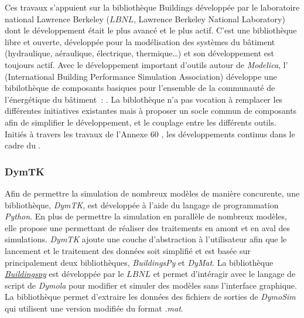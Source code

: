 Ces travaux s’appuient sur la bibliothèque Buildings \parencite{Wetter2014253} développée
par le laboratoire national Lawrence Berkeley ($LBNL$, Lawrence Berkeley National
Laboratory) dont le développement était le plus avancé et le plus actif. C’est une
bibliothèque libre et ouverte, développée pour la modélisation des systèmes du bâtiment
(hydraulique, aéraulique, électrique, thermique\dots) et son développement est toujours
actif.
Avec le développement important d’outils autour de \textit{Modelica}, l’
(International Building Performance Simulation Association) développe une bibilothèque de
composants basiques pour l’ensemble de la communauté de l’énergétique du bâtiment~:
. La biblothèque
n’a pas vocation à remplacer les différentes initiatives existantes mais à proposer un
socle commun de composants afin de simplifier le développement, et le couplage entre les
différents outils. Initiés à travers les travaux de l’Annexe $60$ \parencite{Wetter2015},
les développements continus dans le cadre du .


\subsubsection{DymTK} %
\label{ssub:dymtk}
Afin de permettre la simulation de nombreux modèles de manière concurente, une
bibliothèque, \textit{DymTK}, est développée à l’aide du langage de programmation
\textit{Python}. En plus de permettre la simulation en parallèle de nombreux modèles, elle
propose une  permettant de réaliser des traitements en amont et en aval des
simulations. \textit{DymTK} ajoute une couche d’abstraction à l’utilisateur afin que le
lancement et le traitement des données soit simplifié et est basée sur principalement deux
bibliothèques, \textit{BuildingsPy} et \textit{DyMat}. La bibliothèque
\href{http://simulationresearch.lbl.gov/modelica/buildingspy/}{\textit{Buildingspy}} est
développée par le $LBNL$ et permet d’intéragir avec le langage de script de
\textit{Dymola} pour modifier et simuler des modèles sans l’interface graphique. La
bibliothèque 
permet d’extraire les données des fichiers de sorties de
\textit{DymoSim} qui utilisent une version modifiée du format \textit{.mat}.


